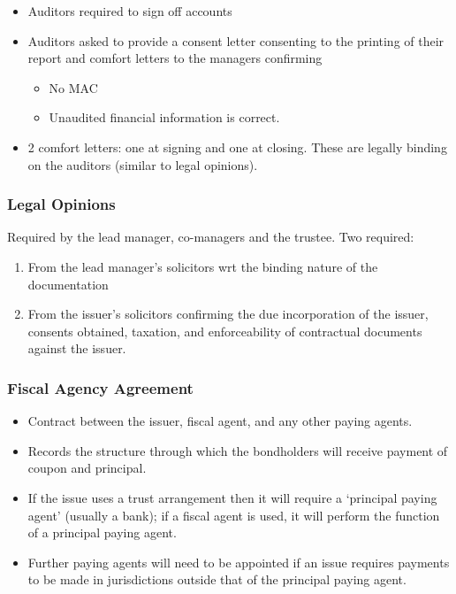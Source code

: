 \documentclass[
]{article}
\providecommand{\tightlist}{%
  \setlength{\itemsep}{0pt}\setlength{\parskip}{0pt}}
\begin{document}
\begin{itemize}
\tightlist
\item
  Auditors required to sign off accounts
\item
  Auditors asked to provide a consent letter consenting to the printing
  of their report and comfort letters to the managers confirming

  \begin{itemize}
  \tightlist
  \item
    No MAC
  \item
    Unaudited financial information is correct.
  \end{itemize}
\item
  2 comfort letters: one at signing and one at closing. These are
  legally binding on the auditors (similar to legal opinions).
\end{itemize}

\hypertarget{legal-opinions}{%
\subsubsection{Legal Opinions}\label{legal-opinions}}

Required by the lead manager, co-managers and the trustee. Two required:

\begin{enumerate}
\tightlist
\item
  From the lead manager's solicitors wrt the binding nature of the
  documentation
\item
  From the issuer's solicitors confirming the due incorporation of the
  issuer, consents obtained, taxation, and enforceability of contractual
  documents against the issuer.
\end{enumerate}

\hypertarget{fiscal-agency-agreement}{%
\subsubsection{Fiscal Agency Agreement}\label{fiscal-agency-agreement}}

\begin{itemize}
\tightlist
\item
  Contract between the issuer, fiscal agent, and any other paying
  agents.
\item
  Records the structure through which the bondholders will receive
  payment of coupon and principal.
\item
  If the issue uses a trust arrangement then it will require a
  `principal paying agent' (usually a bank); if a fiscal agent is used,
  it will perform the function of a principal paying agent.
\item
  Further paying agents will need to be appointed if an issue requires
  payments to be made in jurisdictions outside that of the principal
  paying agent.
\end{itemize}
\end{document}
